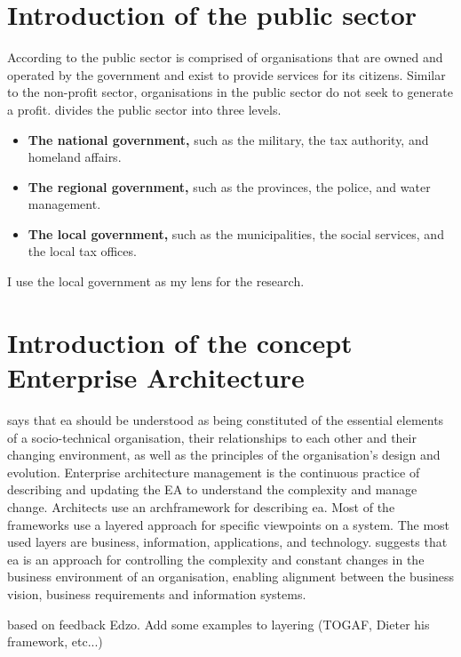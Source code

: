 \section{Introduction of the public sector}
\label{sec:intropublicsector}
According to \textcite{PrivacySense2016} the public sector is comprised of organisations that are owned and operated by the government and exist to provide services for its citizens. Similar to the non-profit sector, organisations in the public sector do not seek to generate a profit. \textcite{PrivacySense2016} divides the public sector into three levels.

\begin{itemize}
	\item{\textbf{The national government,} such as the military, the tax authority, and homeland affairs.}
	\item{\textbf{The regional government,} such as the provinces, the police, and water management.}
	\item{\textbf{The local government,} such as the municipalities, the social services, and the local tax offices.}
\end{itemize}
I use the local government as my lens for the research.

\section{Introduction of the concept Enterprise Architecture}
\label{sec:introea}

\textcite[p. 104]{Lapalme2016} says that \acrshort{ea} should be understood as being constituted of the essential elements of a socio-technical organisation, their relationships to each other and their changing environment, as well as the principles of the organisation’s design and evolution. Enterprise architecture management is the continuous practice of describing and updating the EA to understand the complexity and manage change. Architects use an \gls{archframework} for describing \acrshort{ea}. Most of the frameworks use a layered approach for specific viewpoints on a system. The most used layers are business, information, applications, and technology. \textcite[p. 189]{Ylimaeki2005} suggests that \acrshort{ea} is an approach for controlling the complexity and constant changes in the business environment of an organisation, enabling alignment between the business vision, business requirements and information systems.

\begin{remark}
based on feedback Edzo. Add some examples to layering (TOGAF, Dieter his framework, etc...)
\end{remark}

